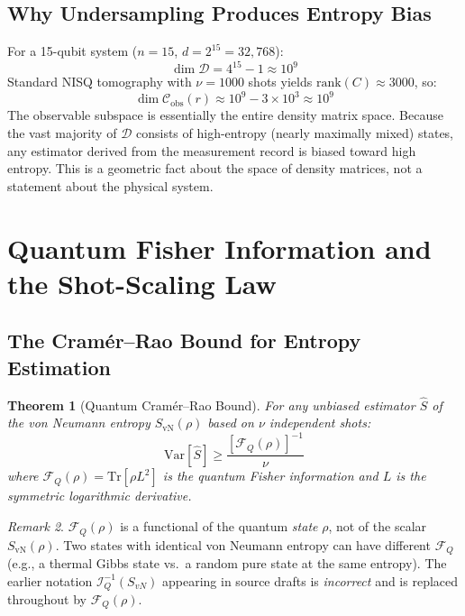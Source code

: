 \documentclass[12pt,letterpaper]{article}
\theoremstyle{plain}
\newtheorem{theorem}{Theorem}[section]
\theoremstyle{definition}
\theoremstyle{remark}
\newtheorem{remark}[theorem]{Remark}
\newcommand{\SvN}{S_{\mathrm{vN}}}
\newcommand{\Shat}{\hat{S}}
\newcommand{\FQ}{\mathcal{F}_Q}
\newcommand{\Cdensity}{\mathcal{D}}
\newcommand{\Cobs}{\mathcal{C}_{\mathrm{obs}}}
\newcommand{\rank}{\mathrm{rank}}
\begin{document}
\subsection{Why Undersampling Produces Entropy Bias}

For a 15-qubit system ($n=15$, $d = 2^{15} = 32{,}768$):
\begin{equation}
  \dim\Cdensity = 4^{15} - 1 \approx 10^9
  \tag{B1.5}
\end{equation}
Standard NISQ tomography with $\nu = 1000$ shots yields $\rank(C) \approx
3000$, so:
\begin{equation}
  \dim\Cobs(r) \approx 10^9 - 3\times10^3 \approx 10^9
  \tag{B1.6}
\end{equation}
The observable subspace is essentially the entire density matrix space.
Because the vast majority of $\Cdensity$ consists of high-entropy
(nearly maximally mixed) states, any estimator derived from the
measurement record is biased toward high entropy. This is a geometric
fact about the space of density matrices, not a statement about the
physical system.

\section{Quantum Fisher Information and the Shot-Scaling Law}
\label{sec:fisher}

\subsection{The Cram\'er--Rao Bound for Entropy Estimation}

\begin{theorem}[Quantum Cram\'er--Rao Bound]
For any unbiased estimator $\Shat$ of the von Neumann entropy $\SvN(\rho)$
based on $\nu$ independent shots:
\begin{equation}
  \mathrm{Var}[\Shat] \geq \frac{[\FQ(\rho)]^{-1}}{\nu}
  \tag{B2.1}
  \label{eq:CRB}
\end{equation}
where $\FQ(\rho) = \mathrm{Tr}[\rho L^2]$ is the quantum Fisher
information and $L$ is the symmetric logarithmic derivative.
\end{theorem}

\begin{remark}
$\FQ(\rho)$ is a functional of the quantum \emph{state} $\rho$, not of
the scalar $\SvN(\rho)$. Two states with identical von Neumann entropy
can have different $\FQ$ (e.g., a thermal Gibbs state vs.\ a random pure
state at the same entropy). The earlier notation $\mathcal{I}_Q^{-1}(S_{vN})$
appearing in source drafts is \emph{incorrect} and is replaced throughout
by $\FQ(\rho)$.
\end{remark}
\end{document}
